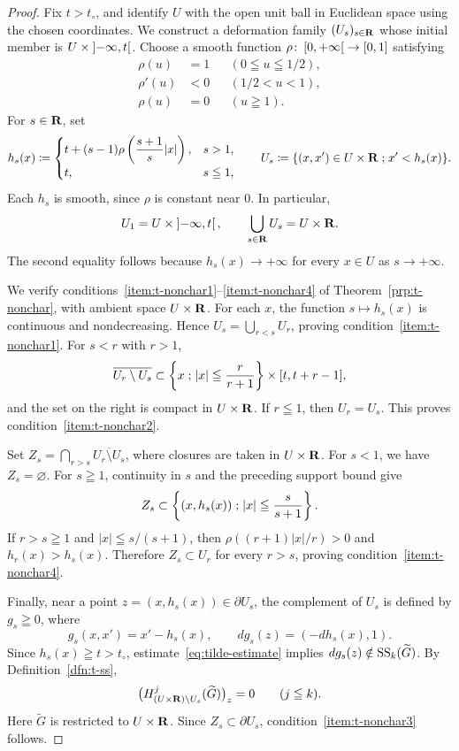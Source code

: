 \begin{proof}
  Fix \(t>t_{\circ}\), and identify \(U\) with the open unit ball
  in Euclidean space using the chosen coordinates.
  We construct a deformation family \((U_s)_{s\in\rr}\)
  whose initial member is \(U\times\lopen-\infty,t\ropen\).
  Choose a smooth function \(\rho\colon\lclosed0,+\infty\ropen\to[0,1]\)
  satisfying
  \begin{align*}
    \rho(u)&=1 &&(0\leqq u\leqq 1/2),\\
    \rho'(u)&<0 &&(1/2<u<1),\\
    \rho(u)&=0 &&(u\geqq1).
  \end{align*}
  For \(s\in\rr\), set
  \[
    h_s(x)\coloneqq
    \begin{cases}
      t+(s-1)\rho\left(\dfrac{s+1}{s}|x|\right),&s>1,\\
      t,&s\leqq1,
    \end{cases}
    \qquad
    U_s\coloneqq\{(x,x')\in U\times\rr\smid x'<h_s(x)\}.
  \]
  Each \(h_s\) is smooth, since \(\rho\) is constant near \(0\).
  In particular,
  \[
    U_1=U\times\lopen-\infty,t\ropen,
    \qquad \bigcup_{s\in\rr}U_s=U\times\rr.
  \]
  The second equality follows because \(h_s(x)\to+\infty\)
  for every \(x\in U\) as \(s\to+\infty\).

  We verify conditions~\eqref{item:t-nonchar1}--\eqref{item:t-nonchar4}
  of Theorem~\ref{prp:t-nonchar}, with ambient space \(U\times\rr\).
  For each \(x\), the function \(s\mapsto h_s(x)\) is continuous
  and nondecreasing. Hence \(U_s=\bigcup_{r<s}U_r\), proving
  condition~\eqref{item:t-nonchar1}.
  For \(s<r\) with \(r>1\),
  \[
    \overline{U_r\setminus U_s}
    \subset
    \left\{x\smid |x|\leqq\frac{r}{r+1}\right\}
    \times[t,t+r-1],
  \]
  and the set on the right is compact in \(U\times\rr\).
  If \(r\leqq1\), then \(U_r=U_s\).
  This proves condition~\eqref{item:t-nonchar2}.

  Set \(Z_s=\bigcap_{r>s}\overline{U_r\setminus U_s}\),
  where closures are taken in \(U\times\rr\).
  For \(s<1\), we have \(Z_s=\varnothing\).
  For \(s\geqq1\), continuity in \(s\) and the preceding support bound give
  \[
    Z_s\subset
    \left\{(x,h_s(x))\smid |x|\leqq\frac{s}{s+1}\right\}.
  \]
  If \(r>s\geqq1\) and \(|x|\leqq s/(s+1)\), then
  \(\rho((r+1)|x|/r)>0\) and \(h_r(x)>h_s(x)\).
  Therefore \(Z_s\subset U_r\) for every \(r>s\), proving
  condition~\eqref{item:t-nonchar4}.

  Finally, near a point \(z=(x,h_s(x))\in\partial U_s\),
  the complement of \(U_s\) is defined by \(g_s\geqq0\), where
  \[
    g_s(x,x')=x'-h_s(x),\qquad dg_s(z)=(-dh_s(x),1).
  \]
  Since \(h_s(x)\geqq t>t_{\circ}\), estimate~\eqref{eq:tilde-estimate}
  implies \(dg_s(z)\notin\muS[k](\widetilde{G})\).
  By Definition~\ref{dfn:t-ss},
  \[
    \bigl(H^j_{(U\times\rr)\setminus U_s}(\widetilde{G})\bigr)_z=0
    \qquad(j\leqq k).
  \]
  Here \(\widetilde{G}\) is restricted to \(U\times\rr\).
  Since \(Z_s\subset\partial U_s\), condition~\eqref{item:t-nonchar3}
  follows.


\end{proof}
